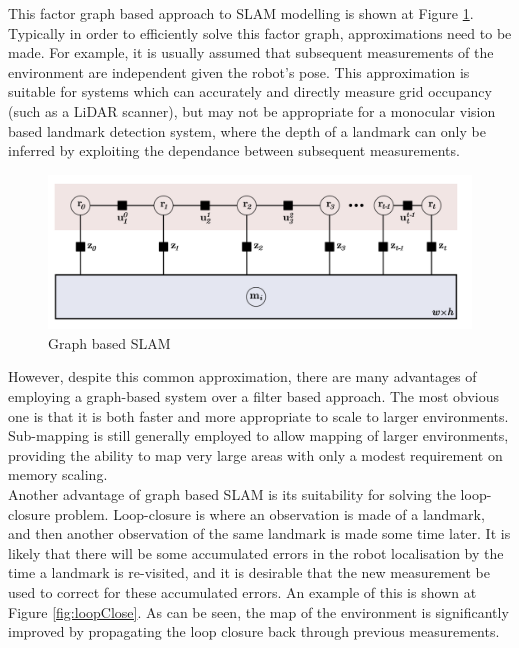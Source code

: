 \documentclass[capstone_report.tex]{subfiles}
\begin{document}
    This factor graph based approach to SLAM modelling is shown at Figure \ref{fig:graphSlam1}. Typically in order to efficiently solve this factor graph, approximations need to be made. For example, it is usually assumed that subsequent measurements of the environment are independent given the robot's pose. This approximation is suitable for systems which can accurately and directly measure grid occupancy (such as a LiDAR scanner), but may not be appropriate for a monocular vision based landmark detection system, where the depth of a landmark can only be inferred by exploiting the dependance between subsequent measurements.

    \begin{figure}[H]
        \centering
        \includegraphics[width=1\textwidth]{imgs/placeholderDiagram.png}
        \caption{Graph based SLAM\label{fig:graphSlam1}}
    \end{figure}

    However, despite this common approximation, there are many advantages of employing a graph-based system over a filter based approach. The most obvious one is that it is both faster and more appropriate to scale to larger environments. Sub-mapping is still generally employed to allow mapping of larger environments, providing the ability to map very large areas with only a modest requirement on memory scaling. \\

    Another advantage of graph based SLAM is its suitability for solving the loop-closure problem. Loop-closure is where an observation is made of a landmark, and then another observation of the same landmark is made some time later. It is likely that there will be some accumulated errors in the robot localisation by the time a landmark is re-visited, and it is desirable that the new measurement be used to correct for these accumulated errors. An example of this is shown at Figure \ref{fig:loopClose}. As can be seen, the map of the environment is significantly improved by propagating the loop closure back through previous measurements.
\end{document}

